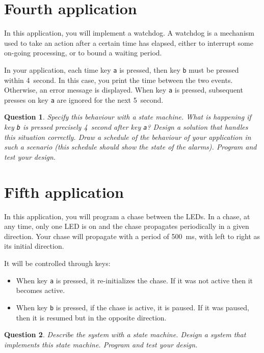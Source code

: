 \documentclass[11pt]{report}
\newtheorem{ex}{Question}
\begin{document}
\section{Fourth application}

In this application, you will implement a watchdog.
A watchdog is a mechanism used to take an action after a certain time has elapsed, either to interrupt some on-going processing, or to bound a waiting period.

In your application, each time key \verb-a- is pressed, then key \verb-b- must be pressed within \SI{4}{second}.
In this case, you print the time between the two events.
Otherwise, an error message is displayed.
When key \verb-a- is pressed, subsequent presses on key \verb-a- are ignored for the next \SI{5}{second}.

\begin{ex}
  Specify this behaviour with a state machine.
  What is happening if key \verb-b- is pressed precisely \SI{4}{second} after key \verb-a-?
  Design a solution that handles this situation correctly.
  Draw a schedule of the behaviour of your application in such a scenario (this schedule should show the state of the alarms).
  Program and test your design.
\end{ex}

\section{Fifth application}

In this application, you will program a chase between the LEDs.
In a chase, at any time, only one LED is on and the chase propagates periodically in a given direction.
Your chase will propagate with a period of \SI{500}{\milli\second}, with left to right as its initial direction.

It will be controlled through keys:
\begin{itemize}
  \item
    When key \verb-a- is pressed, it re-initializes the chase.
    If it was not active then it becomes active.
  \item
    When key \verb-b- is pressed, if the chase is active, it is paused.
    If it was paused, then it is resumed but in the opposite direction.
\end{itemize}

\begin{ex}
  Describe the system with a state machine.
  Design a system that implements this state machine.
  Program and test your design.
\end{ex}
\end{document}

